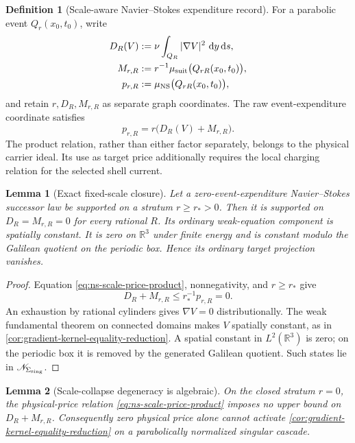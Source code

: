 \documentclass[11pt]{article}
\numberwithin{section}{part}
\theoremstyle{plain}
\newtheorem{lemma}[lemma]{Lemma}
\theoremstyle{definition}
\newtheorem{definition}[definition]{Definition}
\theoremstyle{remark}
\newcommand{\dd}{\,\mathrm d}
\newcommand{\Null}{\mathscr N}
\begin{document}
\begin{definition}[Scale-aware Navier--Stokes expenditure record]
\label{def:ns-scale-aware-expenditure}
For a parabolic event \(Q_r(x_0,t_0)\), write
\begin{align}
 D_R(V)&:=\nu\int_{Q_R}|\nabla V|^2\,\dd y\dd s,\\
 M_{r,R}&:=r^{-1}\mu_{\rm suit}
 \bigl(Q_{rR}(x_0,t_0)\bigr),\\
 p_{r,R}&:=\mu_{\rm NS}\bigl(Q_{rR}(x_0,t_0)\bigr),
\end{align}
and retain \(r,D_R,M_{r,R}\) as separate graph coordinates.  The raw
event-expenditure coordinate satisfies
\begin{equation}
 \label{eq:ns-scale-price-product}
 p_{r,R}=r\bigl(D_R(V)+M_{r,R}\bigr).
\end{equation}
The product relation, rather than either factor separately, belongs to the
physical carrier ideal.  Its use as target price additionally requires the
local charging relation for the selected shell current.
\end{definition}

\begin{lemma}[Exact fixed-scale closure]
\label{lem:ns-fixed-scale-closure}
Let a zero-event-expenditure Navier--Stokes successor law be supported on a stratum
\(r\ge r_*>0\).  Then it is supported on
\(D_R=M_{r,R}=0\) for every rational \(R\).  Its ordinary weak-equation component
is spatially constant.  It is zero on \(\mathbb R^3\) under finite energy and
is constant modulo the Galilean quotient on the periodic box.  Hence its
ordinary target projection vanishes.
\end{lemma}

\begin{proof}
Equation \eqref{eq:ns-scale-price-product}, nonnegativity, and
\(r\ge r_*\) give
\[
 D_R+M_{r,R}\le r_*^{-1}p_{r,R}=0.
\]
An exhaustion by rational cylinders gives \(\nabla V=0\) distributionally.
The weak fundamental theorem on connected domains makes \(V\) spatially
constant, as in \cref{cor:gradient-kernel-equality-reduction}.  A spatial
constant in \(L^2(\mathbb R^3)\) is zero; on the periodic box it is removed
by the generated Galilean quotient.  Such states lie in
\(\Null_{\Sigma_{\rm sing}}\).
\end{proof}

\begin{lemma}[Scale-collapse degeneracy is algebraic]
\label{lem:ns-scale-collapse-degeneracy}
On the closed stratum \(r=0\), the physical-price relation
\eqref{eq:ns-scale-price-product} imposes no upper bound on \(D_R+M_{r,R}\).
Consequently zero physical price alone cannot activate
\cref{cor:gradient-kernel-equality-reduction} on a parabolically normalized
singular cascade.
\end{lemma}
\end{document}
